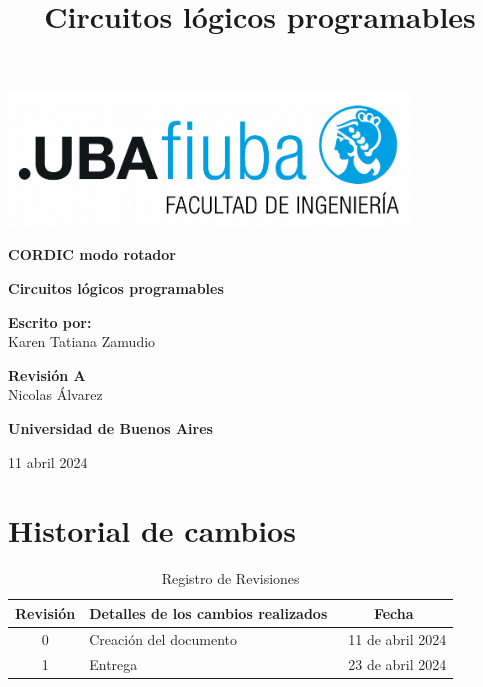 \documentclass[12pt,a4paper, twoside]{article} %
\date{}
\title{Circuitos lógicos programables}
\begin{document}
\renewcommand\refname{}
\renewcommand{\contentsname}{Tabla de contenido}
\newpage

\begin{titlepage}
    \begin{center}
        \vspace*{1cm}

                \includegraphics[width=0.8\textwidth]{Figuras/logoFIUBA.pdf} %

        \vspace{1.5cm}

        \textbf{\LARGE CORDIC modo rotador}

        \vspace{4cm}
        \textbf{\Large Circuitos lógicos programables}

        \vspace{1.5cm}


        \textbf{\Large Escrito por:}\\
        \large Karen Tatiana Zamudio

        \vspace{0.8cm}

        \textbf{\Large Revisión A}\\
        \large Nicolas Álvarez

        \vfill

        \textbf{\Large Universidad de Buenos Aires}\\
        \vspace{0.2cm}

        \large  11 abril 2024

    \end{center}
\end{titlepage}
\newpage

\section*{Historial de cambios}
\label{sec:registro}

\begin{table}[ht]
  \centering
  \caption{Registro de Revisiones}
  \label{tab:registro}
  \begin{tabularx}{\linewidth}{|c|X|c|}
    \hline
    Revisión & Detalles de los cambios realizados & Fecha \\
    \hline
    0 & Creación del documento & \ 11 de abril 2024 \\
    \hline
    1 & Entrega  & \ 23 de abril 2024 \\
    \hline
  \end{tabularx}
\end{table}
\end{document}
